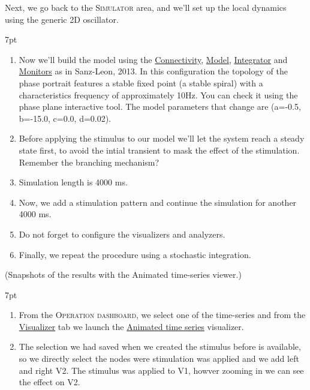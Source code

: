 \documentclass{tufte-handout}
\newenvironment{formal}{%
  \def\FrameCommand{%
    \hspace{1pt}%
    {\color{DarkBlue}\vrule width 2pt}%
    {\color{formalshade}\vrule width 4pt}%
    \colorbox{formalshade}%
  }%
  \MakeFramed{\advance\hsize-\width\FrameRestore}%
  \noindent\hspace{-4.55pt}%
  \begin{adjustwidth}{}{7pt}%
  \vspace{2pt}\vspace{2pt}%
}
{%
  \vspace{2pt}\end{adjustwidth}\endMakeFramed%
}
\newenvironment{simulation}{%
  \def\FrameCommand{%
    \hspace{1pt}%
    {\color{ForestGreen}\vrule width 2pt}%
    {\color{simulationshade}\vrule width 4pt}%
    \colorbox{simulationshade}%
  }%
  \MakeFramed{\advance\hsize-\width\FrameRestore}%
  \noindent\hspace{-4.55pt}%
  \begin{adjustwidth}{}{7pt}%
  \vspace{2pt}\vspace{2pt}%
}
{%
  \vspace{2pt}\end{adjustwidth}\endMakeFramed%
}
\begin{document}
Next, we go back to the \textsc{Simulator} area, and we'll set up the local dynamics using the generic 2D oscillator.

\begin{simulation}
\begin{enumerate}
\item Now we'll build the model using the \underline{Connectivity}, \underline{Model}, \underline{Integrator} and \underline{Monitors} as in Sanz-Leon, 2013. In this configuration the topology of the phase portrait features a stable fixed point (a stable spiral) with a characteristics frequency of approximately 10Hz. You can check it using the phase plane interactive tool. 
The model parameters that change are (a=-0.5, b=-15.0, c=0.0, d=0.02).
\item Before applying the stimulus to our model we'll let the system reach a steady state first, to avoid the intial transient to mask the effect of the stimulation. Remember the branching mechanism?
\item Simulation length is 4000 ms.
\item Now, we add a stimulation pattern and continue the simulation for another 4000 ms.
\item Do not forget to configure the visualizers and analyzers. 
\item Finally, we repeat the procedure using a stochastic integration.
\end{enumerate}
\end{simulation}

(Snapshots of the results with the Animated time-series viewer.)


\begin{formal}
\begin{enumerate}
\item From the \textsc{Operation dashboard}, we select one of the time-series and from the \underline{Visualizer} tab we launch the \underline{Animated time series} visualizer. 
\item The selection we had saved when we created the stimulus before is available, so we directly select the nodes were stimulation was applied and we add left and right V2. The stimulus was applied to V1, howver zooming in we can see the effect on V2. 
\end{enumerate}
\end{formal}
\end{document}
